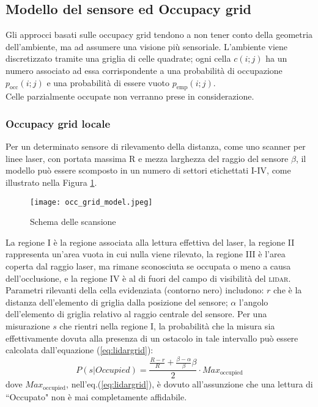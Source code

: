 \subsection{Modello del sensore ed Occupacy grid}
\label{sec:occupacygrid}
Gli approcci basati sulle occupacy grid tendono a non tener conto della geometria 
dell'ambiente, ma ad assumere una visione più sensoriale.
L'ambiente viene discretizzato tramite una griglia di celle quadrate; ogni 
cella $c(i; j)$ ha un numero associato ad essa corrispondente a una probabilità 
di occupazione $p_{\text{occ}}(i; j)$ e una probabilità di essere 
vuoto $p_{\text{emp}}(i;j)$.\\
Celle parzialmente occupate non verranno prese in considerazione.

\subsubsection{Occupacy grid locale}
\label{ssec:localoccgrid}
Per un determinato sensore di rilevamento della distanza, come uno scanner per 
linee laser, con portata massima R e mezza larghezza del raggio del sensore
$\beta$, il modello può essere scomposto in un numero di settori etichettati 
I-IV\cite{ardhaoui2011implementation}, come illustrato nella Figura \ref{fig:scan scheme}.
%
\begin{figure}[htb]
  \texttt{[image: occ\_grid\_model.jpeg]}
  \caption{Schema delle scansione}
  \label{fig:scan scheme}
\end{figure}

\noindent La regione I è la regione associata alla lettura effettiva del laser, la
regione II rappresenta un'area vuota in cui nulla viene rilevato, la regione III
è l'area coperta dal raggio laser, ma rimane sconosciuta se occupata o meno a
causa dell'occlusione, e la regione IV è al di fuori del campo di visibilità del \textsc{lidar}.
Parametri rilevanti della cella evidenziata (contorno nero) includono: $r$ che 
è la distanza dell'elemento di griglia dalla posizione del sensore; 
$\alpha$ l'angolo dell'elemento di griglia relativo al raggio centrale del sensore.
Per una misurazione $s$ che rientri nella regione I, la probabilità che la
misura sia effettivamente dovuta alla presenza di  un ostacolo in tale 
intervallo può essere calcolata dall'equazione (\ref{eq:lidargrid}):
%
\begin{equation}	
\label{eq:lidargrid}
P(s|Occupied) = \frac{\frac{R-r}{R} + \frac{ \beta- \alpha}{\beta} \beta}{2} 
\cdot Max_{\text{occupied}}
\end{equation}
%
dove $Max_{\text{occupied}}$, nell'eq.(\ref{eq:lidargrid}), è dovuto all'assunzione 
che una lettura di ``Occupato" non è mai completamente affidabile.
%
